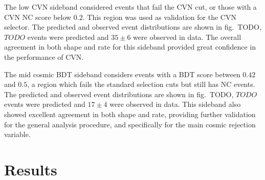 The low CVN sideband considered events that fail the CVN cut, or those with a CVN NC score below $0.2$. This region was used as validation for the CVN selector. The predicted and observed event distributions are shown in fig.~TODO, $TODO$ events were predicted and $35 \pm 6$ were observed in data. The overall agreement in both shape and rate for this sideband provided great confidence in the performance of CVN.

The mid cosmic BDT sideband considers events with a BDT score between $0.42$ and $0.5$, a region which fails the standard selection cuts but still has NC events. The predicted and observed event distributions are shown in fig.~TODO, $TODO$ events were predicted and $17 \pm 4$ were observed in data. This sideband also showed excellent agreement in both shape and rate, providing further validation for the general analysis procedure, and specifically for the main cosmic rejection variable.

\section{Results}

